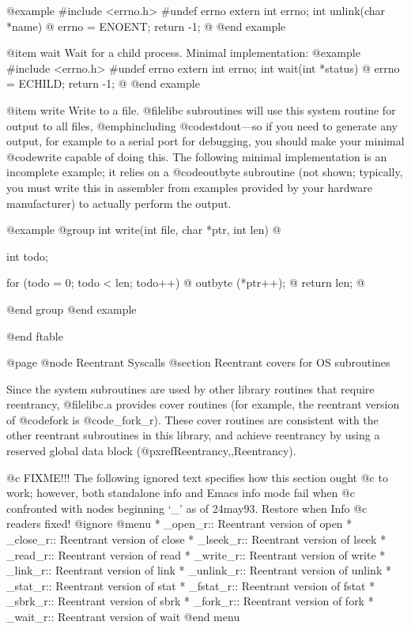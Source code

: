 @example
#include <errno.h>
#undef errno
extern int errno;
int unlink(char *name) @{
  errno = ENOENT;
  return -1;
@}
@end example

@item wait
Wait for a child process.  Minimal implementation:
@example
#include <errno.h>
#undef errno
extern int errno;
int wait(int *status) @{
  errno = ECHILD;
  return -1;
@}
@end example

@item write
Write to a file.  @file{libc} subroutines will use this
system routine for output to all files, @emph{including}
@code{stdout}---so if you need to generate any output, for example to a
serial port for debugging, you should make your minimal @code{write}
capable of doing this.  The following minimal implementation is an
incomplete example; it relies on a @code{outbyte} subroutine (not
shown; typically, you must write this in assembler from examples
provided by your hardware manufacturer) to actually perform the output.

@example
@group
int write(int file, char *ptr, int len) @{
  int todo;

  for (todo = 0; todo < len; todo++) @{
    outbyte (*ptr++);
  @}
  return len;
@}
@end group
@end example

@end ftable

@page
@node Reentrant Syscalls
@section Reentrant covers for OS subroutines

Since the system subroutines are used by other library routines that
require reentrancy, @file{libc.a} provides cover routines (for example,
the reentrant version of @code{fork} is @code{_fork_r}).  These cover
routines are consistent with the other reentrant subroutines in this
library, and achieve reentrancy by using a reserved global data block
(@pxref{Reentrancy,,Reentrancy}).

@c FIXME!!! The following ignored text specifies how this section ought
@c to work;  however, both standalone info and Emacs info mode fail when
@c confronted with nodes beginning `_' as of 24may93.  Restore when Info
@c readers fixed!
@ignore
@menu
* _open_r::	Reentrant version of open
* _close_r::	Reentrant version of close
* _lseek_r::	Reentrant version of lseek
* _read_r::	Reentrant version of read
* _write_r::	Reentrant version of write
* _link_r::     Reentrant version of link
* _unlink_r::   Reentrant version of unlink
* _stat_r::     Reentrant version of stat
* _fstat_r::    Reentrant version of fstat
* _sbrk_r::     Reentrant version of sbrk
* _fork_r::	Reentrant version of fork
* _wait_r::	Reentrant version of wait
@end menu

